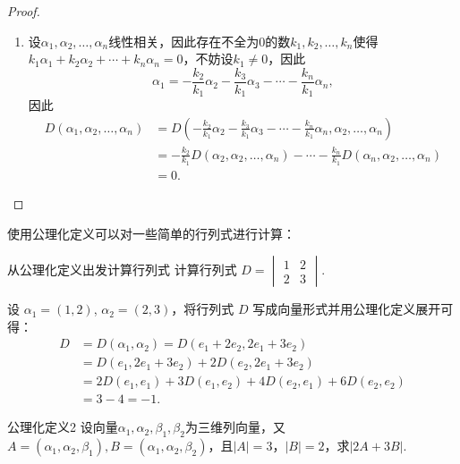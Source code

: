 \begin{proof}
\begin{enumerate}
        \item 设$\alpha_1,\alpha_2,\ldots,\alpha_n$线性相关，因此存在不全为0的数$k_1,k_2,\ldots,k_n$使得$k_1\alpha_1+k_2\alpha_2+\cdots+k_n\alpha_n=0$，不妨设$k_1 \neq 0$，因此
              \[\alpha_1=-\frac{k_2}{k_1}\alpha_2-\frac{k_3}{k_1}\alpha_3-\cdots-\frac{k_n}{k_1}\alpha_n,\]
              因此
              \begin{align*}
                  D(\alpha_1,\alpha_2,\ldots,\alpha_n) & =D(-\frac{k_2}{k_1}\alpha_2-\frac{k_3}{k_1}\alpha_3-\cdots-\frac{k_n}{k_1}\alpha_n,\alpha_2,\ldots,\alpha_n)     \\
                                                       & =-\frac{k_2}{k_1}D(\alpha_2,\alpha_2,\ldots,\alpha_n)-\cdots-\frac{k_n}{k_1}D(\alpha_n,\alpha_2,\ldots,\alpha_n) \\
                                                       & =0.
              \end{align*}
    \end{enumerate}
\end{proof}

使用公理化定义可以对一些简单的行列式进行计算：

\begin{example}{}{从公理化定义出发计算行列式}
    计算行列式 $D = \begin{vmatrix}
        1 & 2 \\
        2 & 3
    \end{vmatrix}$.
\end{example}

\begin{solution}
    设 $\alpha_1 = (1, 2)$, $\alpha_2 = (2, 3)$，将行列式 $D$ 写成向量形式并用公理化定义展开可得：
    \begin{align*}
        D &= D(\alpha_1, \alpha_2) = D(e_1 + 2e_2, 2e_1 + 3e_2) \\
          &= D(e_1, 2e_1 + 3e_2) + 2 D(e_2, 2e_1 + 3e_2) \\
          &= 2D(e_1, e_1) + 3D(e_1, e_2) + 4D(e_2, e_1) + 6D(e_2, e_2) \\
          &= 3 - 4 = -1.
    \end{align*}
\end{solution}

\begin{example}{}{公理化定义2}
    设向量$\alpha_1,\alpha_2,\beta_1,\beta_2$为三维列向量，又$A=(\alpha_1,\alpha_2,\beta_1),B=(\alpha_1,\alpha_2,\beta_2)$，且$|A|=3$，$|B|=2$，求$|2A+3B|$.
\end{example}


